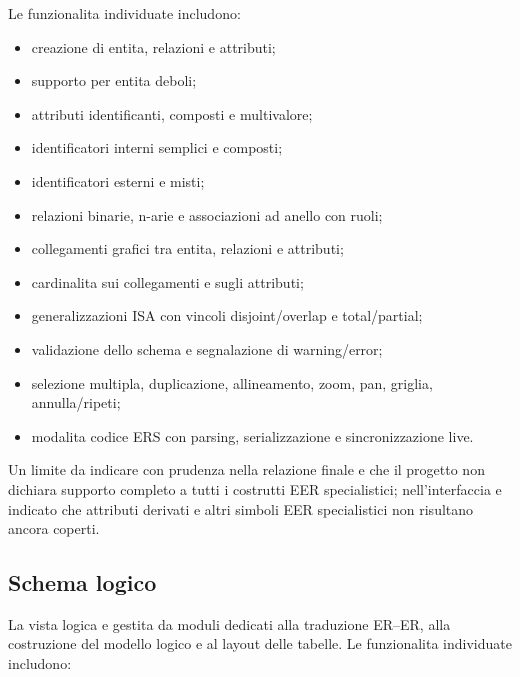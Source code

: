 Le funzionalita individuate includono:

\begin{itemize}
    \item creazione di entita, relazioni e attributi;
    \item supporto per entita deboli;
    \item attributi identificanti, composti e multivalore;
    \item identificatori interni semplici e composti;
    \item identificatori esterni e misti;
    \item relazioni binarie, n-arie e associazioni ad anello con ruoli;
    \item collegamenti grafici tra entita, relazioni e attributi;
    \item cardinalita sui collegamenti e sugli attributi;
    \item generalizzazioni ISA con vincoli disjoint/overlap e total/partial;
    \item validazione dello schema e segnalazione di warning/error;
    \item selezione multipla, duplicazione, allineamento, zoom, pan, griglia, annulla/ripeti;
    \item modalita codice ERS con parsing, serializzazione e sincronizzazione live.
\end{itemize}

Un limite da indicare con prudenza nella relazione finale e che il progetto non dichiara supporto completo a tutti i costrutti EER specialistici; nell'interfaccia e indicato che attributi derivati e altri simboli EER specialistici non risultano ancora coperti.

\subsection{Schema logico}

La vista logica e gestita da moduli dedicati alla traduzione ER--ER, alla costruzione del modello logico e al layout delle tabelle. Le funzionalita individuate includono:


